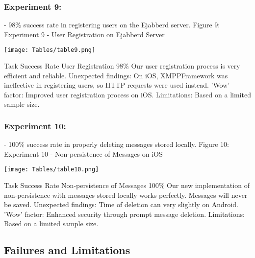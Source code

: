 \documentclass[12pt]{article}
\begin{document}
\subsubsection{Experiment 9:}

- 98\% success rate in registering users on the Ejabberd server.\newline
Figure 9: Experiment 9 - User Registration on Ejabberd Server
\newline
\begin{center}
\texttt{[image: Tables/table9.png]}
\end{center}

Task Success Rate User Registration  98\%  \newline 
Our user registration process is very efficient and reliable.\newline
Unexpected findings: On iOS, XMPPFramework was ineffective in registering users, so HTTP requests were used instead.\newline
'Wow' factor: Improved user registration process on iOS.\newline
Limitations: Based on a limited sample size.\newline


\subsubsection{Experiment 10: }


- 100\% success rate in properly deleting messages stored locally.
Figure 10: Experiment 10 - Non-persistence of Messages on iOS
\newline
\begin{center}
\texttt{[image: Tables/table10.png]}
\end{center}

Task Success Rate Non-persistence of Messages 100\% \newline
Our new implementation of non-persistence with messages stored locally works perfectly. Messages will never be saved.\newline
Unexpected findings: Time of deletion can very slightly on Android. \newline
'Wow' factor: Enhanced security through prompt message deletion.\newline
Limitations: Based on a limited sample size.\newline






\subsection{Failures and Limitations}
\end{document}
